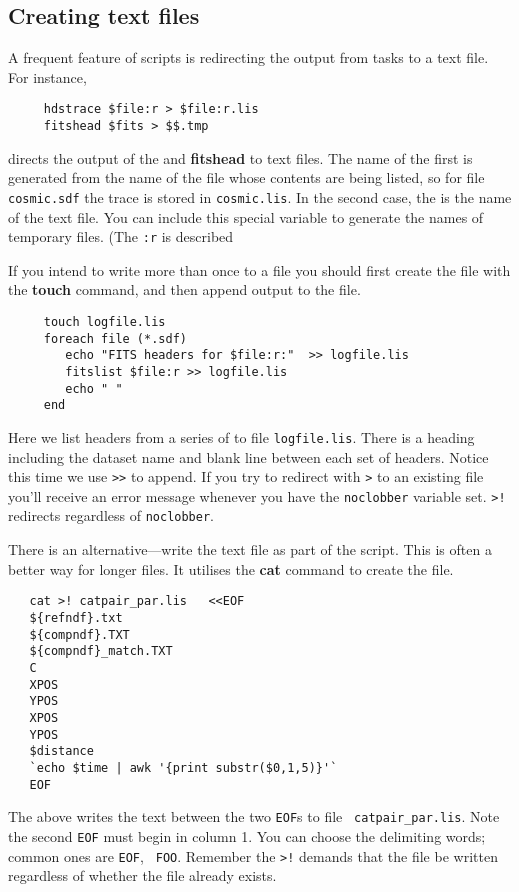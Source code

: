 \newpage
\subsection{Creating text files
\label{sc4_se_create_textfiles}}

A frequent feature of scripts is redirecting the output from tasks to a
text file.  For instance,

\small
\begin{verbatim}
     hdstrace $file:r > $file:r.lis
     fitshead $fits > $$.tmp
\end{verbatim}
\normalsize
directs the output of the  and {\bf
fitshead} to text files. The name of the first is generated from the
name of the file whose contents are being listed, so for {\sf \HDSref}
file {\tt cosmic.sdf} the trace is stored in {\tt cosmic.lis}.  In the
second case, the  is the name of the text file.  You can include
this special variable to generate the names of temporary files.  (The
{\tt :r} is described 

If you intend to write more than once to a file you should first create
the file with the {\bf touch} command, and then append output to the file.

\small
\begin{verbatim}
     touch logfile.lis
     foreach file (*.sdf)
        echo "FITS headers for $file:r:"  >> logfile.lis
        fitslist $file:r >> logfile.lis
        echo " "
     end
\end{verbatim}
\normalsize
Here we list  headers from a series of 
to file {\tt logfile.lis}.  There is a heading including the dataset
name and blank line between each set of headers.  Notice this time
we use {\tt >>} to append.  If you try to redirect with {\tt >}
to an existing file you'll receive an error message whenever you have
the {\tt noclobber} variable set.  {\tt >!} redirects regardless
of {\tt noclobber}.
\bigskip\medskip

There is an alternative---write the text file as part of the script.
This is often a better way for longer files.  It utilises
the {\bf cat} command to create the file.

\small
\begin{verbatim}
   cat >! catpair_par.lis   <<EOF
   ${refndf}.txt
   ${compndf}.TXT
   ${compndf}_match.TXT
   C
   XPOS
   YPOS
   XPOS
   YPOS
   $distance
   `echo $time | awk '{print substr($0,1,5)}'`
   EOF
\end{verbatim}
\normalsize
The above writes the text between the two {\tt EOF}s to file {\tt
catpair\_par.lis}.  Note the second {\tt EOF} must begin in column 1.
You can choose the delimiting words; common ones are {\tt EOF}, {\tt
FOO}.  Remember the {\tt >!} demands that the file be written
regardless of whether the file already exists.

